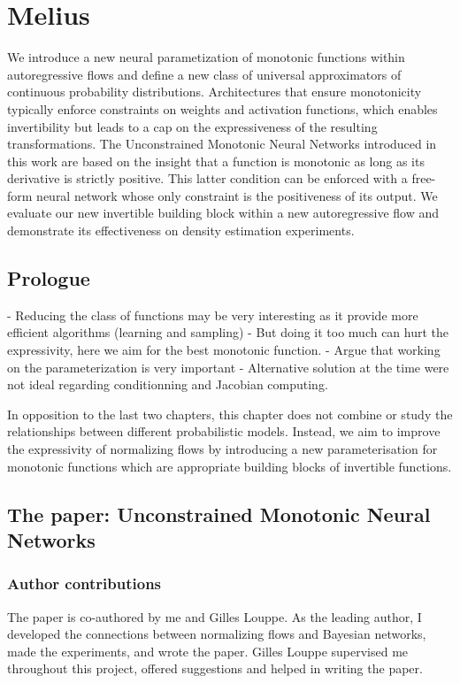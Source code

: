 \chapter{Melius}\label{ch:05}

\begin{chapter_outline}

We introduce a new neural parametization of monotonic functions within autoregressive flows and define a new class of universal approximators of continuous probability distributions.
Architectures that ensure monotonicity typically enforce constraints on weights and activation functions, which enables invertibility but leads to a cap on the expressiveness of the resulting transformations.
The Unconstrained Monotonic Neural Networks introduced in this work are based on the insight that a function is monotonic as long as its derivative is strictly positive. This latter condition can be enforced with a free-form neural network whose only constraint is the positiveness of its output.
We evaluate our new invertible building block within a new autoregressive flow and demonstrate its effectiveness on density estimation experiments.
\end{chapter_outline}

\section{Prologue}

- Reducing the class of functions may be very interesting as it provide more efficient algorithms (learning and sampling)
- But doing it too much can hurt the expressivity, here we aim for the best monotonic function.
- Argue that working on the parameterization is very important
- Alternative solution at the time were not ideal regarding conditionning and Jacobian computing.

In opposition to the last two chapters, this chapter does not combine or study the relationships between different probabilistic models. Instead, we aim to improve the expressivity of normalizing flows by introducing a new parameterisation for monotonic functions which are appropriate building blocks of invertible functions.


\section{The paper: Unconstrained Monotonic Neural Networks}
\subsection{Author contributions}
The paper is co-authored by me and Gilles Louppe. As the leading author, I developed the connections between normalizing flows and Bayesian networks, made the experiments, and wrote the paper. Gilles Louppe supervised me throughout this project, offered suggestions and helped in writing the paper.

